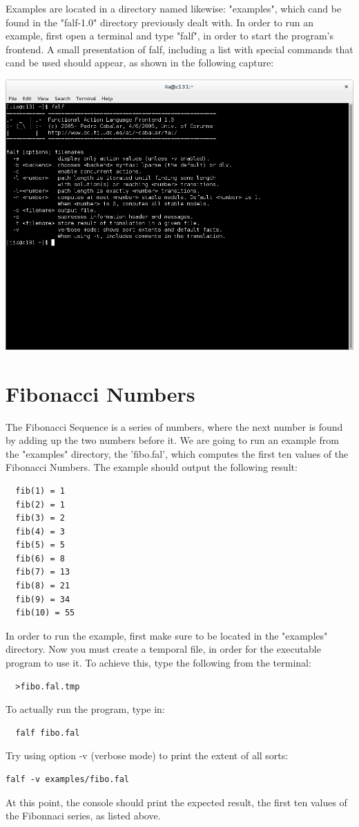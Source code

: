 \documentclass[a4paper,12pt]{report}
\begin{document}
	Examples are located in a directory named likewise: "examples", which cand be found in the "falf-1.0" directory previously dealt with.
In order to run an example, first open a terminal and type "falf", in order to start the program's frontend.
A small presentation of falf, including a list with special commands that cand be used should appear, as shown in the following capture:

\vspace{0.5cm}
\includegraphics[scale=0.4]{Screenshot_terminal_Falf.png}

\section {Fibonacci Numbers}
 
	The Fibonacci Sequence is a series of numbers, where the next number is found by adding up the two numbers before it.
 We are going to run an example from the "examples" directory, the 'fibo.fal', which computes the first ten values of the Fibonacci Numbers.
	The example should output the following result:
 \begin{verbatim}
  fib(1) = 1
  fib(2) = 1
  fib(3) = 2
  fib(4) = 3
  fib(5) = 5
  fib(6) = 8
  fib(7) = 13
  fib(8) = 21
  fib(9) = 34
  fib(10) = 55
 \end{verbatim}

	 In order to run the example, first make sure to be located in the "examples" directory.
 Now you must create a temporal file, in order for the executable program to use it.
	To achieve this, type the following from the terminal:
 \begin{verbatim}
  >fibo.fal.tmp
 \end{verbatim}
	To actually run the program, type in:
 \begin{verbatim}
  falf fibo.fal
 \end{verbatim}
	Try using option -v (verbose mode) to print the extent of all sorts:
\begin{verbatim}
falf -v examples/fibo.fal
\end{verbatim}
	At this point, the console should print the expected result, the first ten values of the Fibonnaci series, as listed above.
\end{document}
